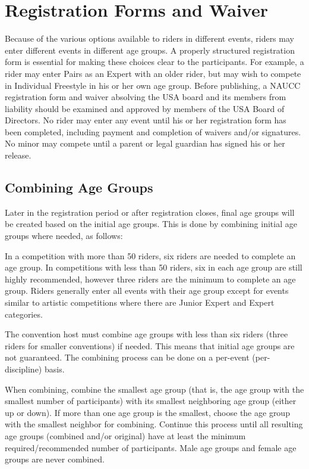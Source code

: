 \section{Registration Forms and Waiver}
Because of the various options available to riders in different events, riders may enter different events in different age groups.
A properly structured registration form is essential for making these choices clear to the participants.
For example, a rider may enter Pairs as an Expert with an older rider, but may wish to compete in Individual Freestyle in his or her own age group.
Before publishing, a NAUCC registration form and waiver absolving the USA board and its members from liability should be examined and approved by members of the USA Board of Directors.
No rider may enter any event until his or her registration form has been completed, including payment and completion of waivers and/or signatures.
No minor may compete until a parent or legal guardian has signed his or her release.

\subsection{Combining Age Groups \label{subsec:general_host's-option-unicon_combining-age-groups}}

Later in the registration period or after registration closes, final age groups will be created based on the initial age groups.
This is done by combining initial age groups where needed, as follows:

In a competition with more than 50 riders, six riders are needed to complete an age group.
In competitions with less than 50 riders, six in each age group are still highly recommended, however three riders are the minimum to complete an age group.
Riders generally enter all events with their age group except for events similar to artistic competitions where there are Junior Expert and Expert categories.

The convention host must combine age groups with less than six riders (three riders for smaller conventions) if needed.
This means that initial age groups are not guaranteed.
The combining process can be done on a per-event (per-discipline) basis.

When combining, combine the smallest age group (that is, the age group with the smallest number of participants) with its smallest neighboring age group (either up or down).
If more than one age group is the smallest, choose the age group with the smallest neighbor for combining.
Continue this process until all resulting age groups (combined and/or original) have at least the minimum required/recommended number of participants.
Male age groups and female age groups are never combined.

